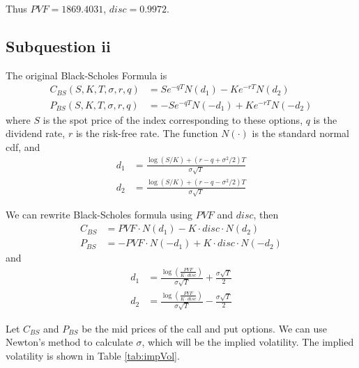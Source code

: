 \documentclass{article}
\DeclareMathOperator{\1}{\mathit{1}}
\numberwithin{figure}{section} %
\numberwithin{table}{section}
\begin{document}
Thus $PVF = 1869.4031$, $disc = 0.9972$.

\subsection{Subquestion ii}

The original Black-Scholes Formula is
	\begin{align*}
	C_{BS}(S, K, T, \sigma, r, q) &= Se^{-qT}N(d_1) - Ke^{-rT}N(d_2) \\
	P_{BS}(S, K, T, \sigma, r, q) &= -Se^{-qT}N(-d_1) + Ke^{-rT}N(-d_2)
	\end{align*}
where $S$ is the spot price of the index corresponding to these options, $q$ is the dividend rate, $r$ is the risk-free rate. The function $N(\cdot)$ is the standard normal cdf, and
	\begin{align*}
	d_1 &= \frac{\log (S/K) + (r-q+\sigma^2/2)T}{\sigma\sqrt{T}} \\
	d_2 &= \frac{\log (S/K) + (r-q-\sigma^2/2)T}{\sigma\sqrt{T}}
	\end{align*}

We can rewrite Black-Scholes formula using $PVF$ and $disc$, then
	\begin{align*}
	C_{BS} &= PVF\cdot N(d_1) - K\cdot disc\cdot N(d_2) \\
	P_{BS} &= -PVF\cdot N(-d_1) + K\cdot disc\cdot N(-d_2) 
	\end{align*}
and
	\begin{align*}
	d_1 & =  \frac{\log \left( \frac{PVF}{K\cdot disc}\right)}{\sigma\sqrt{T}} + \frac{\sigma\sqrt{T}}{2} \\
	d_2 & =  \frac{\log \left( \frac{PVF}{K\cdot disc}\right)}{\sigma\sqrt{T}} - \frac{\sigma\sqrt{T}}{2} 
	\end{align*}
	
Let $C_{BS}$ and $P_{BS}$ be the mid prices of the call and put options. We can use Newton's method to calculate $\sigma$, which will be the implied volatility. The implied volatility is shown in Table \ref{tab:impVol}.
\end{document}
